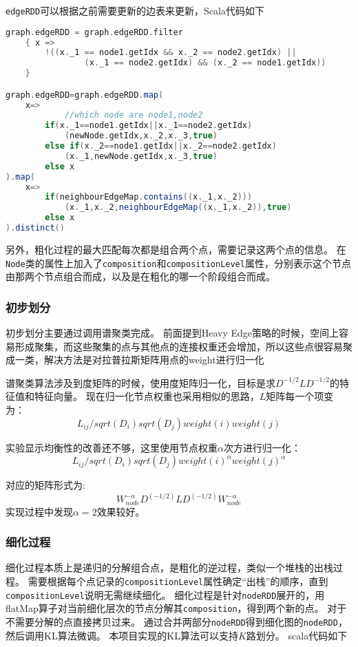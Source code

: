 \texttt{edgeRDD}可以根据之前需要更新的边表来更新，Scala代码如下

\begin{lstlisting}[language=Scala]
graph.edgeRDD = graph.edgeRDD.filter
    { x =>
        !((x._1 == node1.getIdx && x._2 == node2.getIdx) ||
                (x._1 == node2.getIdx) && (x._2 == node1.getIdx))
    }

graph.edgeRDD=graph.edgeRDD.map(
    x=>
            //which node are node1,node2
        if(x._1==node1.getIdx||x._1==node2.getIdx)
            (newNode.getIdx,x._2,x._3,true)
        else if(x._2==node1.getIdx||x._2==node2.getIdx)
            (x._1,newNode.getIdx,x._3,true)
        else x
).map(
    x=>
        if(neighbourEdgeMap.contains((x._1,x._2)))
            (x._1,x._2,neighbourEdgeMap((x._1,x._2)),true)
        else x
).distinct()

\end{lstlisting}

另外，粗化过程的最大匹配每次都是组合两个点，需要记录这两个点的信息。
在\texttt{Node}类的属性上加入了\texttt{composition}和\texttt{compositionLevel}属性，分别表示这个节点由那两个节点组合而成，以及是在粗化的哪一个阶段组合而成。

\subsubsection{初步划分}

初步划分主要通过调用谱聚类完成。
前面提到Heavy Edge策略的时候，空间上容易形成聚集，而这些聚集的点与其他点的连接权重还会增加，所以这些点很容易聚成一类，解决方法是对拉普拉斯矩阵用点的weight进行归一化

谱聚类算法涉及到度矩阵的时候，使用度矩阵归一化，目标是求$D^{-1/2}LD^{-1/2}$的特征值和特征向量。
现在归一化节点权重也采用相似的思路，$L$矩阵每一个项变为：
$$L_{ij}/sqrt(D_i)sqrt(D_j)weight(i)weight(j)$$

实验显示均衡性的改善还不够，这里使用节点权重$\alpha$次方进行归一化：
$$L_{ij}/sqrt(D_i)sqrt(D_j)weight(i)^{\alpha} weight(j)^{\alpha}$$

对应的矩阵形式为:
$$W_{node}^{-\alpha}D^(-1/2)LD^(-1/2)W_{node}^{-\alpha}$$
实现过程中发现$\alpha=2$效果较好。

\subsubsection{细化过程}

细化过程本质上是递归的分解组合点，是粗化的逆过程，类似一个堆栈的出栈过程。
需要根据每个点记录的\texttt{compositionLevel}属性确定“出栈”的顺序，直到\texttt{compositionLevel}说明无需继续细化。
细化过程是针对\texttt{nodeRDD}展开的，用flatMap算子对当前细化层次的节点分解其\texttt{composition}，得到两个新的点。
对于不需要分解的点直接拷贝过来。
通过合并两部分\texttt{nodeRDD}得到细化图的\texttt{nodeRDD}，然后调用KL算法微调。
本项目实现的KL算法可以支持$K$路划分。
scala代码如下

